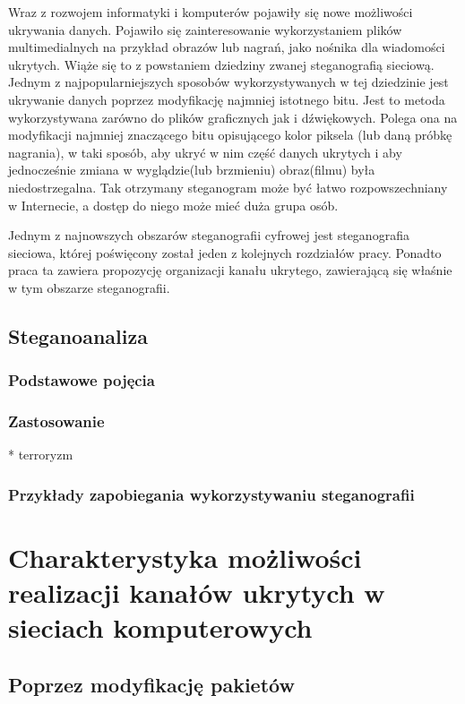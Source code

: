 \documentclass[a4paper, twoside]{report}
\begin{document}
        Wraz z rozwojem informatyki i komputerów pojawiły się nowe możliwości
        ukrywania danych. Pojawiło się zainteresowanie wykorzystaniem plików
        multimedialnych na przykład obrazów lub nagrań, jako nośnika dla wiadomości
        ukrytych. Wiąże się to z powstaniem dziedziny zwanej steganografią sieciową.
        Jednym z najpopularniejszych sposobów wykorzystywanych w tej dziedzinie
        jest ukrywanie danych poprzez modyfikację najmniej istotnego bitu. Jest
        to metoda wykorzystywana zarówno do plików graficznych\cite{LSBSTEGANGRAPHY}
        jak i dźwiękowych\cite{AUDIOLSBSTEGANGRAPHY}.
        Polega ona na modyfikacji najmniej znaczącego bitu opisującego kolor piksela
        (lub daną próbkę nagrania), w taki sposób, aby ukryć w nim część danych
        ukrytych i aby jednocześnie zmiana w wyglądzie(lub brzmieniu) obraz(filmu)
        była niedostrzegalna. Tak otrzymany steganogram może być łatwo rozpowszechniany
        w Internecie, a dostęp do niego może mieć duża grupa osób.

        Jednym z najnowszych obszarów steganografii cyfrowej jest steganografia
        sieciowa, której poświęcony został jeden z kolejnych rozdziałów pracy.
        Ponadto praca ta zawiera propozycję organizacji kanału ukrytego, zawierającą
        się właśnie w tym obszarze steganografii.

    \section{Steganoanaliza}
        \subsection{Podstawowe pojęcia}
        \subsection{Zastosowanie}
        * terroryzm
        \subsection{Przykłady zapobiegania wykorzystywaniu steganografii}

\chapter{Charakterystyka możliwości realizacji kanałów ukrytych w sieciach komputerowych}
    \section{Poprzez modyfikację pakietów}
\end{document}
